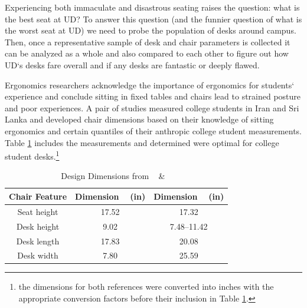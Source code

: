 \documentclass[conference]{IEEEtran}
\begin{document}
Experiencing both immaculate and disastrous seating raises the question: what is the best seat at UD? To answer this question (and the funnier question of what is the worst seat at UD) we need to probe the population of desks around campus. Then, once a representative sample of desk and chair parameters is collected it can be analyzed as a whole and also compared to each other to figure out how UD`s desks fare overall and if any desks are fantastic or deeply flawed.

Ergonomics researchers acknowledge the importance of ergonomics for students` experience and conclude sitting in fixed tables and chairs lead to strained posture and poor experiences\cite{mohamed}.  A pair of studies \cite{mohamed} \cite{Ansari} measured college students in Iran and Sri Lanka and developed chair dimensions based on their knowledge of sitting ergonomics and certain quantiles of their anthropic college student measurements.  Table \ref*{tab:dimension_comparison} includes the measurements \cite{mohamed} and \cite{Ansari} determined were optimal for college student desks.\footnote{the dimensions for both references were converted into inches with the appropriate conversion factors before their inclusion in Table \ref*{tab:dimension_comparison}.}



    
\begin{table}[htbp]
    \caption{ Design Dimensions from ~\cite{mohamed} \& ~\cite{Ansari}}
    \begin{center}
    \begin{tabular}{c c c}
    \toprule
    \textbf{Chair Feature} & \textbf{Dimension ~\cite{mohamed} (in)} & \textbf{Dimension ~\cite{Ansari} (in)} \\
    \midrule
    Seat height & 17.52 & 17.32 \\
    \midrule
    Desk height & 9.02 & 7.48--11.42 \\
    \midrule
    Desk length & 17.83 & 20.08 \\
    \midrule
    Desk width & 7.80 & 25.59 \\
    \bottomrule
    \end{tabular}
    \label{tab:dimension_comparison}
    \end{center}
\end{table}
\end{document}
